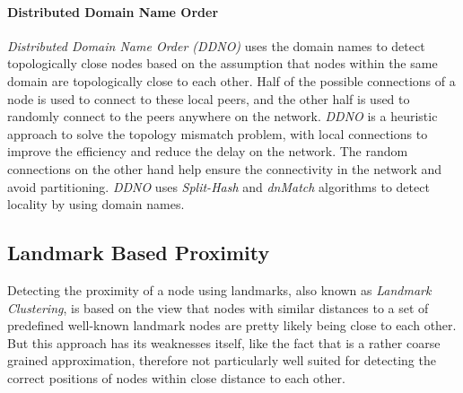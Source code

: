 \paragraph*{\bf Distributed Domain Name Order}
\emph{Distributed Domain Name Order (DDNO)} \cite{z-yk_ddno_2005}
uses the domain names to detect topologically close nodes based on the
assumption that nodes within the same domain are topologically close to each
other. Half of the possible connections of a node is used to connect to these
local peers, and the other half is used to randomly connect to the peers
anywhere on the network. \textit{DDNO} is a heuristic approach to solve the
topology mismatch problem, with local connections to improve the efficiency and
reduce the delay on the network.  The random connections on the other hand help
ensure the connectivity in the network and avoid partitioning. \textit{DDNO}
uses \textit{Split-Hash} and \textit{dnMatch} algorithms to detect locality by
using domain names.

\subsection{Landmark Based Proximity}\label{sec:landmark}

Detecting the proximity of a node using landmarks, also known as
\textit{Landmark Clustering}, is based on the view that nodes with similar
distances to a set of predefined well-known landmark nodes are pretty likely
being close to each other. But this approach has its weaknesses itself, like the
fact that is a rather coarse grained approximation, therefore not particularly
well suited for detecting the correct positions of nodes within close distance
to each other.


